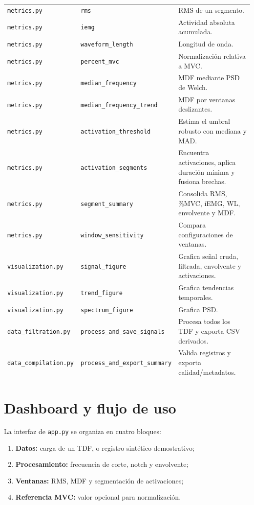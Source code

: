 \documentclass[11pt,spanish]{article}
\begin{document}
\begin{longtable}{p{3.5cm}p{4.2cm}p{6.8cm}}
\texttt{metrics.py} & \texttt{rms} & RMS de un segmento.\\
\texttt{metrics.py} & \texttt{iemg} & Actividad absoluta acumulada.\\
\texttt{metrics.py} & \texttt{waveform\_length} & Longitud de onda.\\
\texttt{metrics.py} & \texttt{percent\_mvc} & Normalización relativa a MVC.\\
\texttt{metrics.py} & \texttt{median\_frequency} & MDF mediante PSD de Welch.\\
\texttt{metrics.py} & \texttt{median\_frequency\_trend} & MDF por ventanas deslizantes.\\
\texttt{metrics.py} & \texttt{activation\_threshold} & Estima el umbral robusto con mediana y MAD.\\
\texttt{metrics.py} & \texttt{activation\_segments} & Encuentra activaciones, aplica duración mínima y fusiona brechas.\\
\texttt{metrics.py} & \texttt{segment\_summary} & Consolida RMS, \%MVC, iEMG, WL, envolvente y MDF.\\
\texttt{metrics.py} & \texttt{window\_sensitivity} & Compara configuraciones de ventanas.\\
\texttt{visualization.py} & \texttt{signal\_figure} & Grafica señal cruda, filtrada, envolvente y activaciones.\\
\texttt{visualization.py} & \texttt{trend\_figure} & Grafica tendencias temporales.\\
\texttt{visualization.py} & \texttt{spectrum\_figure} & Grafica PSD.\\
\texttt{data\_filtration.py} & \texttt{process\_and\_save\_signals} & Procesa todos los TDF y exporta CSV derivados.\\
\texttt{data\_compilation.py} & \texttt{process\_and\_export\_summary} & Valida registros y exporta calidad/metadatos.\\
\bottomrule
\end{longtable}

\section{Dashboard y flujo de uso}

La interfaz de \texttt{app.py} se organiza en cuatro bloques:
\begin{enumerate}
    \item \textbf{Datos:} carga de un TDF, o registro sintético demostrativo;
    \item \textbf{Procesamiento:} frecuencia de corte, notch y envolvente;
    \item \textbf{Ventanas:} RMS, MDF y segmentación de activaciones;
    \item \textbf{Referencia MVC:} valor opcional para normalización.
\end{enumerate}
\end{document}
